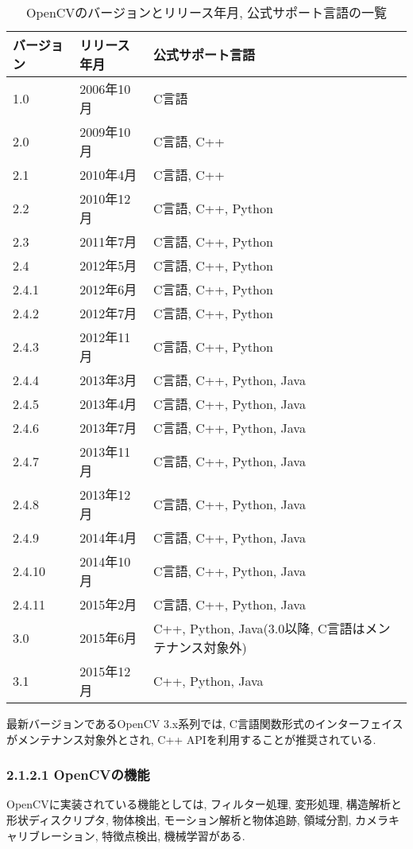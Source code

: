 \begin{table}[htb]
\begin{center}
\begin{tabular}{|l|l|l|} \hline
バージョン & リリース年月 & 公式サポート言語 \\ \hline \hline
1.0 & 2006年10月 & C言語 \\ \hline
2.0 & 2009年10月 & C言語, C++ \\ \hline
2.1 & 2010年4月 & C言語, C++ \\ \hline
2.2 & 2010年12月 & C言語, C++, Python \\ \hline
2.3 & 2011年7月 & C言語, C++, Python \\ \hline
2.4 & 2012年5月 & C言語, C++, Python \\ \hline
2.4.1 & 2012年6月 & C言語, C++, Python \\ \hline
2.4.2 & 2012年7月 & C言語, C++, Python \\ \hline
2.4.3 & 2012年11月 & C言語, C++, Python \\ \hline
2.4.4 & 2013年3月 & C言語, C++, Python, Java \\ \hline
2.4.5 & 2013年4月 & C言語, C++, Python, Java \\ \hline
2.4.6 & 2013年7月 & C言語, C++, Python, Java \\ \hline
2.4.7 & 2013年11月 & C言語, C++, Python, Java \\ \hline
2.4.8 & 2013年12月 & C言語, C++, Python, Java \\ \hline
2.4.9 & 2014年4月 & C言語, C++, Python, Java \\ \hline
2.4.10 & 2014年10月 & C言語, C++, Python, Java \\ \hline
2.4.11 & 2015年2月 & C言語, C++, Python, Java \\ \hline
3.0 & 2015年6月 & C++, Python, Java(3.0以降, C言語はメンテナンス対象外) \\ \hline
3.1 & 2015年12月 & C++, Python, Java \\ \hline
\end{tabular}
\caption{OpenCVのバージョンとリリース年月, 公式サポート言語の一覧}
\end{center}
\end{table}

最新バージョンであるOpenCV 3.x系列では, C言語関数形式のインターフェイスがメンテナンス対象外とされ, C++ APIを利用することが推奨されている.

\subsubsection{2.1.2.1 OpenCVの機能}
OpenCVに実装されている機能としては, フィルター処理, 変形処理, 構造解析と形状ディスクリプタ, 物体検出, モーション解析と物体追跡, 領域分割, カメラキャリブレーション, 特徴点検出, 機械学習がある.

